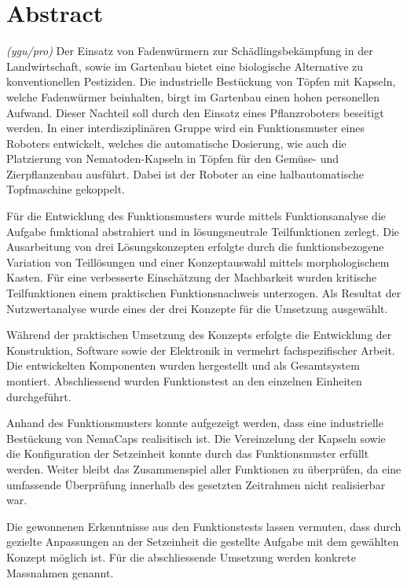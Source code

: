 \newpage
\section{Abstract}
\textit{(ygu/pro)} Der Einsatz von Fadenwürmern zur Schädlingsbekämpfung in der Landwirtschaft, sowie im Gartenbau bietet eine biologische Alternative zu konventionellen Pestiziden. Die industrielle Bestückung von Töpfen mit Kapseln, welche Fadenwürmer beinhalten, birgt im Gartenbau einen hohen personellen Aufwand. Dieser Nachteil soll durch den Einsatz eines Pflanzroboters beseitigt werden. In einer interdisziplinären Gruppe wird  ein Funktionsmuster eines Roboters entwickelt, welches die automatische Dosierung, wie auch die Platzierung von Nematoden-Kapseln in Töpfen für den Gemüse- und Zierpflanzenbau ausführt. Dabei ist der Roboter an eine halbautomatische Topfmaschine gekoppelt.
\newline

Für die Entwicklung des Funktionsmusters wurde mittels Funktionsanalyse die Aufgabe funktional abstrahiert und in lösungsneutrale Teilfunktionen zerlegt. Die Ausarbeitung von drei Lösungskonzepten erfolgte durch die funktionsbezogene Variation von Teillösungen und einer Konzeptauswahl mittels morphologischem Kasten. Für eine verbesserte Einschätzung der Machbarkeit wurden kritische Teilfunktionen einem praktischen Funktionsnachweis unterzogen. Als Resultat der Nutzwertanalyse wurde eines der drei Konzepte für die Umsetzung ausgewählt.
\newline

Während der praktischen Umsetzung des Konzepts erfolgte die Entwicklung der Konstruktion, Software sowie der Elektronik in vermehrt fachspezifischer Arbeit. Die entwickelten Komponenten wurden hergestellt und als Gesamtsystem montiert. Abschliessend wurden Funktionstest an den einzelnen Einheiten durchgeführt.
\newline

Anhand des Funktionsmusters konnte aufgezeigt werden, dass eine industrielle Bestückung von NemaCaps realisitisch ist. Die Vereinzelung der Kapseln sowie die Konfiguration der Setzeinheit konnte durch das Funktionsmuster erfüllt werden. Weiter bleibt das Zusammenspiel aller Funktionen zu überprüfen, da eine umfassende Überprüfung innerhalb des gesetzten Zeitrahmen nicht realisierbar war.
\newline

Die gewonnenen Erkenntnisse aus den Funktionstests lassen vermuten, dass durch gezielte Anpassungen an der Setzeinheit die gestellte Aufgabe mit dem gewählten Konzept möglich ist. Für die abschliessende Umsetzung werden konkrete Massnahmen genannt.

